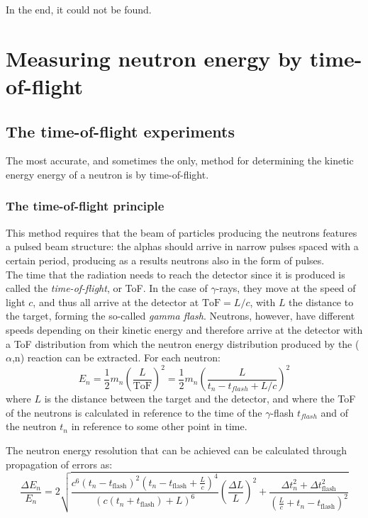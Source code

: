 \documentclass[a4paper,12pt]{report}
\newcommand{\an}{($\alpha$,n) }
\begin{document}
In the end, it could not be found.



\chapter{Measuring neutron energy by time-of-flight}

\section{The time-of-flight experiments}
The most accurate, and sometimes the only, method for determining the kinetic energy energy of a neutron is by time-of-flight.

\subsection{The time-of-flight principle} 
This method requires that the beam of particles producing the neutrons features a pulsed beam structure: the alphas should arrive in narrow pulses spaced with a certain period, producing as a results neutrons also in the form of pulses.
\\

The time that the radiation needs to reach the detector since it is produced is called the \textit{time-of-flight}, or ToF.
In the case of $\gamma$-rays, they move at the speed of light $c$, and thus all arrive at the detector at $\text{ToF}=L/c$, with $L$ the distance to the target, forming the so-called  \textit{gamma flash}.
Neutrons, however, have different speeds depending on their kinetic energy and therefore arrive at the detector with a ToF distribution from which the neutron energy distribution produced by the \an reaction can be extracted.
For each neutron:
\begin{equation}
	E_n=\frac{1}{2} m_n \left( \frac{L}{\text{ToF}} \right)^2 = \frac{1}{2} m_n \left( \frac{L}{t_n - t_{flash} + L/c} \right)^2
	\label{Eq_ToF2En}
\end{equation}
where $L$ is the distance between the target and the detector, and where the ToF of the neutrons is calculated in reference to the time of the $\gamma$-flash $t_{flash}$ and of the neutron $t_n$ in reference to some other point in time.

The neutron energy resolution that can be achieved can be calculated through propagation of errors as:
\begin{equation}
    \frac{\Delta E_n}{E_n} =
    2\sqrt{\frac{c^6\left(t_n-t_\text{flash}\right)^2\left(t_n-t_\text{flash}+\frac{L}{c}\right)^4}{\left(c\left(t_n+t_\text{flash}\right)+L\right)^6}\left(\frac{\Delta L}{L}\right)^2 + \frac{\Delta t_n^2 + \Delta t_\text{flash}^2}{{\left(\frac{L}{c}+t_n-t_\text{flash}\right)}^2}}
    \label{Eq_Enresolution}
\end{equation}
\end{document}
